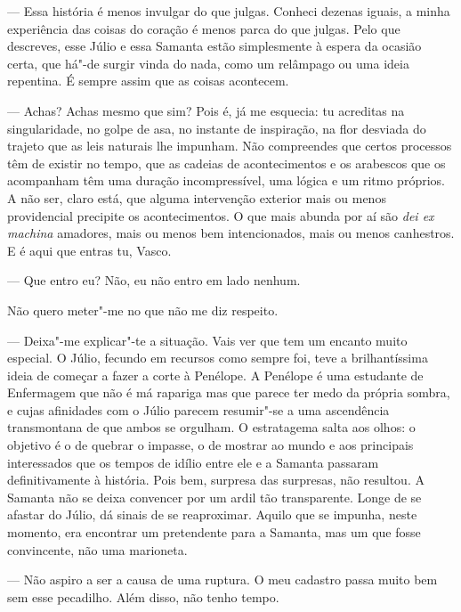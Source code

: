 --- Essa história é menos invulgar do que julgas. Conheci dezenas iguais,
  a minha experiência das coisas do coração é menos parca do que julgas.
  Pelo que descreves, esse Júlio e essa Samanta estão simplesmente à
  espera da ocasião certa, que há"-de surgir vinda do nada, como um relâmpago ou uma ideia repentina. É
sempre assim que as coisas acontecem.

--- Achas? Achas mesmo que sim? Pois é, já me esquecia: tu acreditas na
  singularidade, no golpe de asa, no instante de inspiração, na flor
  desviada do trajeto que as leis naturais lhe impunham. Não
  compreendes que certos processos têm de existir no tempo, que as
  cadeias de acontecimentos e os arabescos que os acompanham têm uma
  duração incompressível, uma lógica e um ritmo próprios. A não ser,
  claro está, que alguma intervenção exterior mais ou menos providencial
  precipite os acontecimentos. O que mais abunda por aí são \emph{dei ex
  machina }amadores, mais ou menos bem intencionados, mais ou menos
  canhestros. E é aqui que entras tu, Vasco.

--- Que entro eu? Não, eu não entro em lado nenhum.

Não quero meter"-me no que não me diz respeito.

--- Deixa"-me explicar"-te a situação. Vais ver que tem um encanto muito
especial. O Júlio, fecundo em recursos como sempre foi, teve a
brilhantíssima ideia de começar a fazer a corte à Penélope. A Penélope
é uma estudante de Enfermagem que não é má rapariga mas que parece ter
medo da própria sombra, e cujas afinidades com o Júlio parecem
resumir"-se a uma ascendência transmontana de que ambos se orgulham. O
estratagema salta aos olhos: o objetivo é o de quebrar o impasse, o
de mostrar ao mundo e aos principais interessados
que os tempos de idílio entre ele e a Samanta passaram definitivamente
à história. Pois bem, surpresa das surpresas, não resultou. A Samanta
não se deixa convencer por um ardil tão transparente. Longe de se
afastar do Júlio, dá sinais de se reaproximar. Aquilo que se impunha,
neste momento, era encontrar um pretendente para a Samanta, mas um que
fosse convincente, não uma marioneta.

--- Não aspiro a ser a causa de uma ruptura. O meu cadastro passa muito
  bem sem esse pecadilho. Além disso, não tenho tempo.

